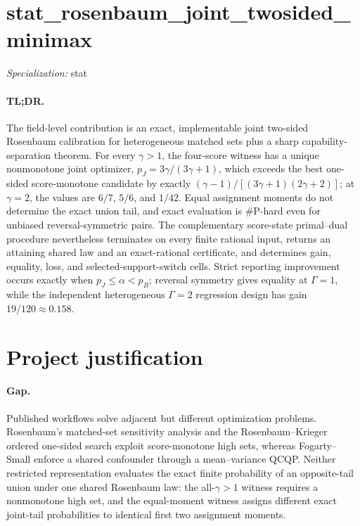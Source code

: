 \documentclass{article}
\begin{document}
\sloppy

\section*{stat\_\allowbreak{}rosenbaum\_\allowbreak{}joint\_\allowbreak{}twosided\_\allowbreak{}minimax}

\noindent\textit{Specialization:} stat\par

\paragraph{TL;DR.} The field-level contribution is an exact, implementable joint two-sided Rosenbaum calibration for heterogeneous matched sets plus a sharp capability-separation theorem. For every \(\gamma>1\), the four-score witness has a unique nonmonotone joint optimizer, \(p_J=3\gamma/(3\gamma+1)\), which exceeds the best one-sided score-monotone candidate by exactly \((\gamma-1)/[(3\gamma+1)(2\gamma+2)]\); at \(\gamma=2\), the values are \(6/7\), \(5/6\), and \(1/42\). Equal assignment moments do not determine the exact union tail, and exact evaluation is \(\#\mathrm P\)-hard even for unbiased reversal-symmetric pairs. The complementary score-state primal--dual procedure nevertheless terminates on every finite rational input, returns an attaining shared law and an exact-rational certificate, and determines gain, equality, loss, and selected-support-switch cells. Strict reporting improvement occurs exactly when \(p_J\le\alpha<p_B\); reversal symmetry gives equality at \(\Gamma=1\), while the independent heterogeneous \(\Gamma=2\) regression design has gain \(19/120\approx0.158\).

\section{Project justification}

\paragraph{Gap.} Published workflows solve adjacent but different optimization problems. Rosenbaum's matched-set sensitivity analysis and the Rosenbaum--Krieger ordered one-sided search exploit score-monotone high sets, whereas Fogarty--Small enforce a shared confounder through a mean--variance QCQP. Neither restricted representation evaluates the exact finite probability of an opposite-tail union under one shared Rosenbaum law: the all-\(\gamma>1\) witness requires a nonmonotone high set, and the equal-moment witness assigns different exact joint-tail probabilities to identical first two assignment moments.
\end{document}
